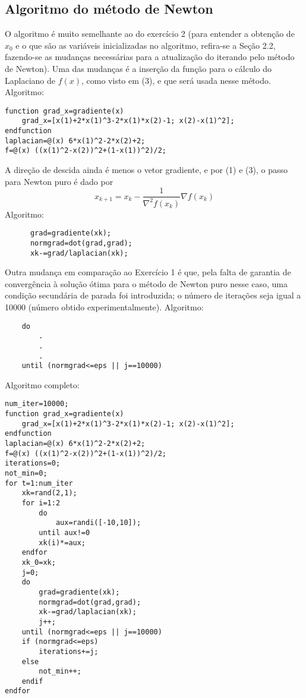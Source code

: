 \documentclass[a4paper, 12pt]{article}
\begin{document}
\subsection{Algoritmo do método de Newton}
O algoritmo é muito semelhante ao do exercício 2 (para entender a obtenção de $x_0$ e o que são as variáveis inicializadas no algoritmo, refira-se a Seção 2.2, fazendo-se as mudanças necessárias para a atualização do iterando pelo método de Newton).
Uma das mudanças é a inserção da função para o cálculo do Laplaciano de $f(x)$, como visto em (3), e que será usada nesse método. Algoritmo:
\begin{lstlisting}
function grad_x=gradiente(x)
    grad_x=[x(1)+2*x(1)^3-2*x(1)*x(2)-1; x(2)-x(1)^2];
endfunction
laplacian=@(x) 6*x(1)^2-2*x(2)+2;
f=@(x) ((x(1)^2-x(2))^2+(1-x(1))^2)/2;
\end{lstlisting}
A direção de descida ainda é menos o vetor gradiente, e por (1) e (3), o passo para Newton puro é dado por
\[
x_{k+1}=x_k-\frac{1}{\nabla^2 f(x_k)}\nabla f(x_k)
\]
Algoritmo:
\begin{lstlisting}
	  grad=gradiente(xk);
	  normgrad=dot(grad,grad);
	  xk-=grad/laplacian(xk);
\end{lstlisting}
Outra mudança em comparação ao Exercício 1 é que, pela falta de garantia de convergência à solução ótima para o método de Newton puro nesse caso, uma condição secundária de parada foi introduzida; o número de iterações seja igual a 10000 (número obtido experimentalmente). Algoritmo:
\begin{lstlisting}
    do
        .
        .
        .
    until (normgrad<=eps || j==10000)
\end{lstlisting}
 Algoritmo completo:
\begin{lstlisting}
num_iter=10000;
function grad_x=gradiente(x)
    grad_x=[x(1)+2*x(1)^3-2*x(1)*x(2)-1; x(2)-x(1)^2];
endfunction
laplacian=@(x) 6*x(1)^2-2*x(2)+2;
f=@(x) ((x(1)^2-x(2))^2+(1-x(1))^2)/2;
iterations=0;
not_min=0;
for t=1:num_iter
    xk=rand(2,1);
    for i=1:2
        do
            aux=randi([-10,10]);
        until aux!=0
        xk(i)*=aux;
    endfor
    xk_0=xk;
    j=0;
    do 
        grad=gradiente(xk);
        normgrad=dot(grad,grad);
        xk-=grad/laplacian(xk);           
        j++;
    until (normgrad<=eps || j==10000)
    if (normgrad<=eps)
        iterations+=j;
    else
        not_min++;
    endif    
endfor
\end{lstlisting}
\end{document}
